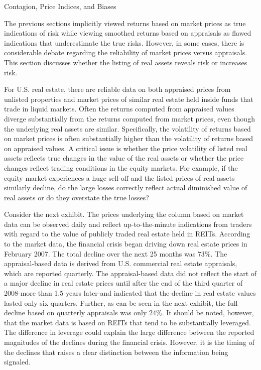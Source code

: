 \documentclass[11pt]{article}
\begin{document}
Contagion, Price Indices, and Biases

The previous sections implicitly viewed returns based on market prices as true indications of risk while viewing smoothed returns based on appraisals as flawed indications that underestimate the true risks. However, in some cases, there is considerable debate regarding the reliability of market prices versus appraisals. This section discusses whether the listing of real assets reveals risk or increases risk.

For U.S. real estate, there are reliable data on both appraised prices from unlisted properties and market prices of similar real estate held inside funds that trade in liquid markets. Often the returns computed from appraised values diverge substantially from the returns computed from market prices, even though the underlying real assets are similar. Specifically, the volatility of returns based on market prices is often substantially higher than the volatility of returns based on appraised values. A critical issue is whether the price volatility of listed real assets reflects true changes in the value of the real assets or whether the price changes reflect trading conditions in the equity markets. For example, if the equity market experiences a huge sell-off and the listed prices of real assets similarly decline, do the large losses correctly reflect actual diminished value of real assets or do they overstate the true losses?

Consider the next exhibit. The prices underlying the column based on market data can be observed daily and reflect up-to-the-minute indications from traders with regard to the value of publicly traded real estate held in REITs. According to the market data, the financial crisis began driving down real estate prices in February 2007. The total decline over the next 25 months was $73 \%$. The appraisal-based data is derived from U.S. commercial real estate appraisals, which are reported quarterly. The appraisal-based data did not reflect the start of a major decline in real estate prices until after the end of the third quarter of 2008-more than 1.5 years later-and indicated that the decline in real estate values lasted only six quarters. Further, as can be seen in the next exhibit, the full decline based on quarterly appraisals was only $24 \%$. It should be noted, however, that the market data is based on REITs that tend to be substantially leveraged. The difference in leverage could explain the large difference between the reported magnitudes of the declines during the financial crisis. However, it is the timing of the declines that raises a clear distinction between the information being signaled.
\end{document}
